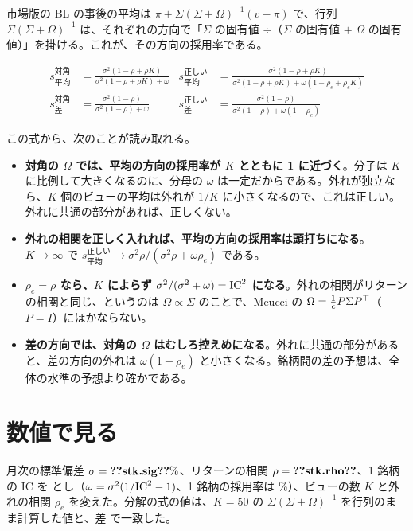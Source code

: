 市場版の BL の事後の平均は $\pi+\Sigma(\Sigma+\Omega)^{-1}(v-\pi)$ で、行列 $\Sigma(\Sigma+\Omega)^{-1}$ は、それぞれの方向で「$\Sigma$ の固有値 ÷（$\Sigma$ の固有値 $+$ $\Omega$ の固有値）」を掛ける。これが、その方向の採用率である。

\begin{align}
s_{\text{平均}}^{\text{対角}}&=\frac{\sigma^2(1-\rho+\rho K)}{\sigma^2(1-\rho+\rho K)+\omega}
&s_{\text{平均}}^{\text{正しい}}&=\frac{\sigma^2(1-\rho+\rho K)}{\sigma^2(1-\rho+\rho K)+\omega(1-\rho_e+\rho_eK)}\\
s_{\text{差}}^{\text{対角}}&=\frac{\sigma^2(1-\rho)}{\sigma^2(1-\rho)+\omega}
&s_{\text{差}}^{\text{正しい}}&=\frac{\sigma^2(1-\rho)}{\sigma^2(1-\rho)+\omega(1-\rho_e)}
\end{align}

この式から、次のことが読み取れる。

\begin{itemize}
\item \textbf{対角の $\Omega$ では、平均の方向の採用率が $K$ とともに 1 に近づく}。分子は $K$ に比例して大きくなるのに、分母の $\omega$ は一定だからである。外れが独立なら、$K$ 個のビューの平均は外れが $1/K$ に小さくなるので、これは正しい。外れに共通の部分があれば、正しくない。
\item \textbf{外れの相関を正しく入れれば、平均の方向の採用率は頭打ちになる}。$K\to\infty$ で $s_{\text{平均}}^{\text{正しい}}\to\sigma^2\rho/(\sigma^2\rho+\omega\rho_e)$ である。
\item \textbf{$\rho_e=\rho$ なら、$K$ によらず $\sigma^2/(\sigma^2+\omega)=\mathrm{IC}^2$ になる}。外れの相関がリターンの相関と同じ、というのは $\Omega\propto\Sigma$ のことで、Meucci の $\Omega=\frac1c P\Sigma P^{\top}$（$P=I$）にほかならない。
\item \textbf{差の方向では、対角の $\Omega$ はむしろ控えめになる}。外れに共通の部分があると、差の方向の外れは $\omega(1-\rho_e)$ と小さくなる。銘柄間の差の予想は、全体の水準の予想より確かである。
\end{itemize}

\section{数値で見る}

月次の標準偏差 $\sigma=\V{stk.sig}\%$、リターンの相関 $\rho=\V{stk.rho}$、1 銘柄の IC を  とし（$\omega=\sigma^2(1/\mathrm{IC}^2-1)$、1 銘柄の採用率は \%）、ビューの数 $K$ と外れの相関 $\rho_e$ を変えた。分解の式の値は、$K=50$ の $\Sigma(\Sigma+\Omega)^{-1}$ を行列のまま計算した値と、差  で一致した。

